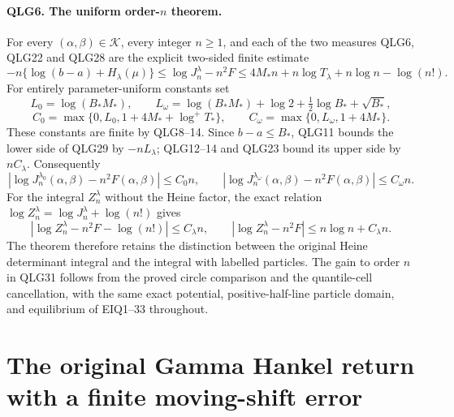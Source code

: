 \documentclass[11pt,a4paper]{article}
\begin{document}
\paragraph{QLG6. The uniform order-\(n\) theorem.}
For every \((\alpha,\beta)\in\mathcal K\), every integer \(n\geq1\),
and each of the two measures QLG6, QLG22 and QLG28 are the explicit
two-sided finite estimate
\[
 \boxed{
 -n\{\log(b-a)+H_\lambda(\mu)\}
 \leq\log J_n^\lambda-n^2F
 \leq 4M_*n+n\log T_\lambda+n\log n-\log(n!).}
 \tag{QLG29}
\]
For entirely parameter-uniform constants set
\[
 L_0=\log(B_*M_*),\qquad
 L_\omega=\log(B_*M_*)+\log2+\tfrac12\log B_*+\sqrt{B_*},
\]
\[
 C_0=\max\{0,L_0,1+4M_*+\log^+T_*\},\qquad
 C_\omega=\max\{0,L_\omega,1+4M_*\}.
 \tag{QLG30}
\]
These constants are finite by QLG8--14. Since \(b-a\leq B_*\),
QLG11 bounds the lower side of QLG29 by \(-nL_\lambda\); QLG12--14
and QLG23 bound its upper side by \(nC_\lambda\). Consequently
\[
 \boxed{\left|\log J_n^{\lambda_0}(\alpha,\beta)
                 -n^2F(\alpha,\beta)\right|\leq C_0n,
 \qquad
 \left|\log J_n^{\lambda_\omega}(\alpha,\beta)
                 -n^2F(\alpha,\beta)\right|\leq C_\omega n.}
 \tag{QLG31}
\]
For the integral \(Z_n^\lambda\) without the Heine factor, the exact
relation \(\log Z_n^\lambda=\log J_n^\lambda+\log(n!)\) gives
\[
 \left|\log Z_n^\lambda-n^2F-\log(n!)\right|\leq C_\lambda n,
 \qquad
 \left|\log Z_n^\lambda-n^2F\right|
                         \leq n\log n+C_\lambda n.
 \tag{QLG32}
\]
The theorem therefore retains the distinction between the original
Heine determinant integral and the integral with labelled particles.
The gain to order \(n\) in QLG31 follows from the proved circle
comparison and the quantile-cell cancellation, with the same exact
potential, positive-half-line particle domain, and equilibrium of
EIQ1--33 throughout.



\section{The original Gamma Hankel return with a finite moving-shift error}
\label{sec:QGT}
\end{document}
